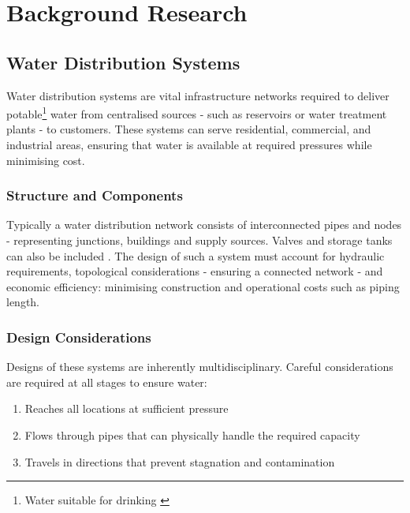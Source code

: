 
\chapter{Background Research}\label{Background}  %

\ifpdf
    \graphicspath{{Chapter2/Figs/Raster/}{Chapter2/Figs/PDF/}{Chapter2/Figs/}}
\else
    \graphicspath{{Chapter2/Figs/Vector/}{Chapter2/Figs/}}
\fi
\section{Water Distribution Systems}\label{waterdistributionsystems}
Water distribution systems are vital infrastructure networks required to deliver potable\footnote{Water suitable for drinking \citep{watereducationfoundation_2014}} water from centralised sources - such as reservoirs or water treatment plants - to customers. These systems can serve residential, commercial, and industrial areas, ensuring that water is available at required pressures while minimising cost. \citep{NAP11728}
\subsection{Structure and Components}
Typically a water distribution network consists of interconnected pipes and nodes - representing junctions, buildings and supply sources. Valves and storage tanks can also be included \citep{Christodoulou2018}. The design of such a system must account for hydraulic requirements, topological considerations - ensuring a connected network - and economic efficiency: minimising construction and operational costs such as piping length.
\subsection{Design Considerations}
Designs of these systems are inherently multidisciplinary. Careful considerations are required at all stages to ensure water:
\begin{enumerate}
    \item Reaches all locations at sufficient pressure
    \item Flows through pipes that can physically handle the required capacity
    \item Travels in directions that prevent stagnation and contamination
\end{enumerate}


